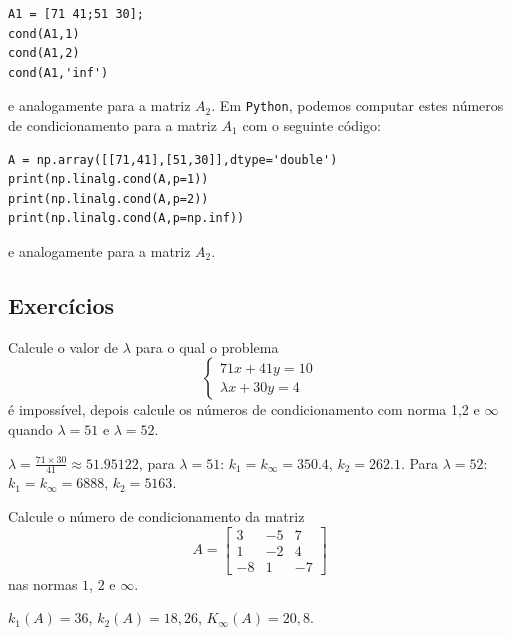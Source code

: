 \begin{sol}
\begin{verbatim}
A1 = [71 41;51 30];
cond(A1,1)
cond(A1,2)
cond(A1,'inf')
\end{verbatim}
e analogamente para a matriz $A_2$.
\fi
\ifispython
Em \verb+Python+, podemos computar estes números de condicionamento para a matriz $A_1$ com o seguinte código:
\begin{verbatim}
A = np.array([[71,41],[51,30]],dtype='double')
print(np.linalg.cond(A,p=1))
print(np.linalg.cond(A,p=2))
print(np.linalg.cond(A,p=np.inf))
\end{verbatim}
e analogamente para a matriz $A_2$.
\fi
\end{sol}

\subsection*{Exercícios}

\begin{exer} Calcule o valor de $\lambda$ para o qual o problema
\begin{equation}\left\{ \begin{array}{l}71x+41y=10\\
\lambda x+30y=4
\end{array}
\right.\end{equation}
é impossível, depois calcule os números de condicionamento com norma 1,2 e $\infty$ quando $\lambda=51$ e $\lambda=52$.
\end{exer}
\begin{resp}

$\lambda=\frac{71\times 30}{41}\approx  51.95122$, para $\lambda=51$: $k_1=k_\infty=350.4$, $k_2=262.1$. Para $\lambda=52$: $k_1=k_\infty= 6888$, $k_2=5163$.

\end{resp}

\begin{exer}
  Calcule o número de condicionamento da matriz
\begin{equation}A=\left[
\begin{array}{ccc}
3 & -5 & 7\\
1 & -2 & 4\\
-8 & 1 & -7
\end{array}
\right]\end{equation}
nas normas $1$, $2$ e $\infty$.
\end{exer}
\begin{resp}

  $k_1(A)=36$, $k_2(A)=18,26$, $K_\infty(A)=20,8$.

\end{resp}

